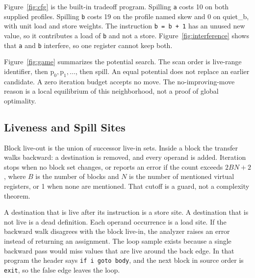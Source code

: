 \documentclass{ieeeaccess}
\begin{document}

Figure~\ref{fig:cfg} is the built-in tradeoff program.
Spilling \texttt{a} costs 10 on both supplied profiles.
Spilling \texttt{b} costs 19 on the profile named skew and 0 on quiet\_b, with unit load and store weights.
The instruction \texttt{b = b + 1} has an unused new value, so it contributes a load of \texttt{b} and not a store.
Figure~\ref{fig:interference} shows that \texttt{a} and \texttt{b} interfere, so one register cannot keep both.



Figure~\ref{fig:game} summarizes the potential search.
The scan order is live-range identifier, then $\mathrm{p}_0,\mathrm{p}_1,\ldots$, then spill.
An equal potential does not replace an earlier candidate.
A zero iteration budget accepts no move.
The no-improving-move reason is a local equilibrium of this neighborhood, not a proof of global optimality.


\subsection{Liveness and Spill Sites}
\label{sec:liveness}
Block live-out is the union of successor live-in sets.
Inside a block the transfer walks backward: a destination is removed, and every operand is added.
Iteration stops when no block set changes, or reports an error if the count exceeds $2BN+2$, where $B$ is the number of blocks and $N$ is the number of mentioned virtual registers, or 1 when none are mentioned.
That cutoff is a guard, not a complexity theorem.

A destination that is live after its instruction is a store site.
A destination that is not live is a dead definition.
Each operand occurrence is a load site.
If the backward walk disagrees with the block live-in, the analyzer raises an error instead of returning an assignment.
The loop sample exists because a single backward pass would miss values that are live around the back edge.
In that program the header says \texttt{if i goto body}, and the next block in source order is \texttt{exit}, so the false edge leaves the loop.
\end{document}
